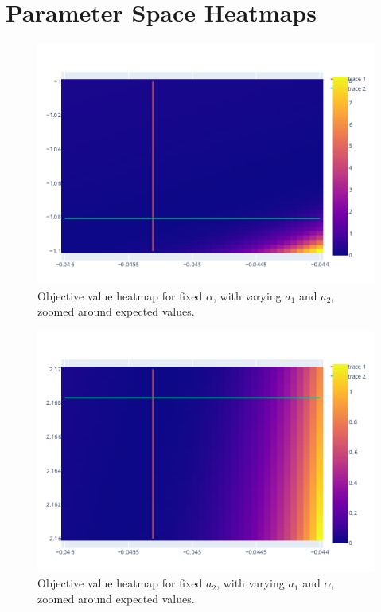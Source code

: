 
\chapter{Parameter Space Heatmaps}
\label{Parameter Space Heatmaps}

\begin{figure}[h!]
    \centering
    \includegraphics[scale=0.7]{imgs/c4/heat-1-zoomed-current-only.png}
    \caption{Objective value heatmap for fixed $\alpha$, with varying 
    $a_1$ and $a_2$, zoomed around expected values.}
    \label{heat-1-zoomed}
\end{figure}

\begin{figure}[h!]
    \centering
    \includegraphics[scale=0.7]{imgs/c4/heat-2-zoomed-current-only.png}
    \caption{Objective value heatmap for fixed $a_2$, with varying 
    $a_1$ and $\alpha$, zoomed around expected values.}
    \label{heat-2-zoomed}
\end{figure}

